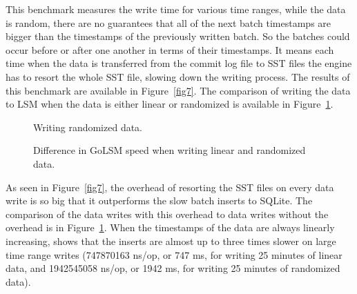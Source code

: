 This benchmark measures the write time for various time ranges, while the data is random, there are no guarantees that all of the next batch timestamps are bigger than the timestamps of the previously written batch. So the batches could occur before or after one another in terms of their timestamps. It means each time when the data is transferred from the commit log file to SST files the engine has to resort the whole SST file, slowing down the writing process. The results of this benchmark are available in Figure~\ref{fig7}. The comparison of writing the data to LSM when the data is either linear or randomized is available in Figure~\ref{fig8}.

\begin{figure}[!htb]
   \begin{minipage}{0.48\textwidth}
    \centering
    \resizebox{\textwidth}{!}{%
        
    }
    \caption{Writing randomized data.}\label{fig7}
   \end{minipage}\hfill
   \begin{minipage}{0.48\textwidth}
    \centering
    \resizebox{\textwidth}{!}{%
        
    }
     \caption{Difference in GoLSM speed when writing linear and randomized data.}\label{fig8}
   \end{minipage}
\end{figure}

As seen in Figure~\ref{fig7}, the overhead of resorting the SST files on every data write is so big that it outperforms the slow batch inserts to SQLite. The comparison of the data writes with this overhead to data writes without the overhead is in Figure~\ref{fig8}. When the timestamps of the data are always linearly increasing, shows that the inserts are almost up to three times slower on large time range writes (747870163 ns/op, or 747 ms, for writing 25 minutes of linear data, and 1942545058 ns/op, or 1942 ms, for writing 25 minutes of randomized data).